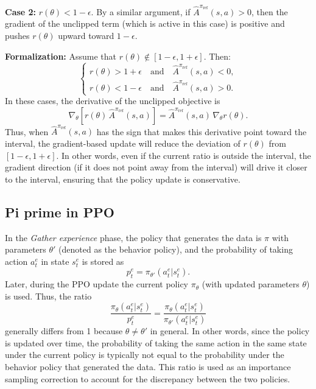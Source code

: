 \textbf{Case 2:} $r(\theta)<1-\epsilon$. By a similar argument, if $\hat{A}^{\pi_{\text{ref}}}(s,a)>0$, then the gradient of the unclipped term (which is active in this case) is positive and pushes $r(\theta)$ upward toward $1-\epsilon$.

\textbf{Formalization:} Assume that $r(\theta)\notin[1-\epsilon,1+\epsilon]$. Then:
\[
\begin{cases}
  r(\theta) > 1+\epsilon \quad \text{and} \quad \hat{A}^{\pi_{\text{ref}}}(s,a)<0,\\[1mm]
  r(\theta) < 1-\epsilon \quad \text{and} \quad \hat{A}^{\pi_{\text{ref}}}(s,a)>0.
\end{cases}
\]
In these cases, the derivative of the unclipped objective is
\[
  \nabla_\theta \left[ r(\theta)\,\hat{A}^{\pi_{\text{ref}}}(s,a) \right] = \hat{A}^{\pi_{\text{ref}}}(s,a)\, \nabla_\theta r(\theta).
\]
Thus, when $\hat{A}^{\pi_{\text{ref}}}(s,a)$ has the sign that makes this derivative point toward the interval, the gradient-based update will reduce the deviation of $r(\theta)$ from $[1-\epsilon,1+\epsilon]$. In other words, even if the current ratio is outside the interval, the gradient direction (if it does not point away from the interval) will drive it closer to the interval, ensuring that the policy update is conservative.

\vspace{2mm}

\subsection{Pi prime in PPO}

In the \emph{Gather experience} phase, the policy that generates the data is $\pi$ with parameters $\theta'$ (denoted as the behavior policy), and the probability of taking action $a_t^e$ in state $s_t^e$ is stored as 
\[
  p_t^e = \pi_{\theta'}(a_t^e|s_t^e).
\]
Later, during the PPO update the current policy $\pi_{\theta}$ (with updated parameters $\theta$) is used. Thus, the ratio
\[
  \frac{\pi_{\theta}(a_t^e|s_t^e)}{p_t^e} = \frac{\pi_{\theta}(a_t^e|s_t^e)}{\pi_{\theta'}(a_t^e|s_t^e)}
\]
generally differs from 1 because $\theta \neq \theta'$ in general. In other words, since the policy is updated over time, the probability of taking the same action in the same state under the current policy is typically not equal to the probability under the behavior policy that generated the data. This ratio is used as an importance sampling correction to account for the discrepancy between the two policies.
